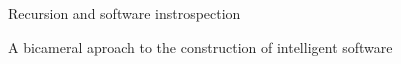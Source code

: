 \documentclass[landscape]{slides}
\begin{document}
\begin{slide}
Recursion and software instrospection
\end{slide}

\begin{slide}
A bicameral aproach to the construction of intelligent software
\end{slide}
\end{document}
